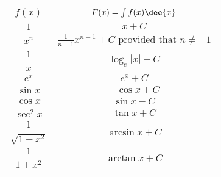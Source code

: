 \begin{theorem}\label{thm imp indef int}

\begin{center}

\renewcommand{\arraystretch}{2.5}
     \begin{tabular}{|c|c|}
        \hline
    $f(x)$ & $ F(x)=\int f(x)\dee{x}$ \\
        \hline\hline
    $1$ & $x+C$ \\  \hline
    $x^n$ & $\frac{1}{n+1}x^{n+1}+C\text{ provided that }n \ne-1$ \\  \hline
    $\dfrac{1}{x}$ & $\log_e|x|+C$ \\  \hline\hline
    $e^x$ & $e^x+C$ \\ \hline\hline
    $\sin x$ & $-\cos x+C$ \\  \hline
    $\cos x$ & $\sin x+C$ \\  \hline
    $\sec^2 x$ & $\tan x+C$ \\  \hline\hline
   $\dfrac{1}{\sqrt{1-x^2}}$ & $\arcsin x+C$ \\  \hline
  $\dfrac{1}{1+x^2}$ & $\arctan x+C$ \\
   \hline
     \end{tabular}
\renewcommand{\arraystretch}{1.0}

\end{center}
\end{theorem}

